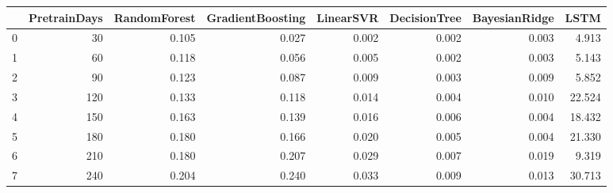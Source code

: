 \begin{tabular}{lrrrrrrr}
\toprule
{} &  PretrainDays &  RandomForest &  GradientBoosting &  LinearSVR &  DecisionTree &  BayesianRidge &   LSTM \\
\midrule
0 &            30 &         0.105 &             0.027 &      0.002 &         0.002 &          0.003 &  4.913 \\
1 &            60 &         0.118 &             0.056 &      0.005 &         0.002 &          0.003 &  5.143 \\
2 &            90 &         0.123 &             0.087 &      0.009 &         0.003 &          0.009 &  5.852 \\
3 &           120 &         0.133 &             0.118 &      0.014 &         0.004 &          0.010 & 22.524 \\
4 &           150 &         0.163 &             0.139 &      0.016 &         0.006 &          0.004 & 18.432 \\
5 &           180 &         0.180 &             0.166 &      0.020 &         0.005 &          0.004 & 21.330 \\
6 &           210 &         0.180 &             0.207 &      0.029 &         0.007 &          0.019 &  9.319 \\
7 &           240 &         0.204 &             0.240 &      0.033 &         0.009 &          0.013 & 30.713 \\
\bottomrule
\end{tabular}
